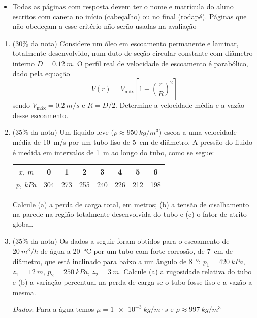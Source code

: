 \documentclass[12pt,a4paper,brazilian]{article}
\newcommand{\ratio}[1]{(#1\% da nota)}
\begin{document}
\begin{tcolorbox}[colback=black!10, colframe=black!50, title=Observações]
    \begin{itemize}
        \item Todas as páginas com resposta devem ter o nome e matrícula do
            aluno escritos com caneta no início (cabeçalho) ou no final
            (rodapé). Páginas que não obedeçam a esse critério não serão usadas
            na avaliação
    \end{itemize}
\end{tcolorbox}

\vspace{2em}

\begin{enumerate}
    \item \ratio{30} Considere um óleo em escoamento permanente e laminar,
        totalmente desenvolvido, num duto de seção circular constante com
        diâmetro interno \(D=\SI{0.12}{m}\). O perfil real de velocidade de 
        escoamento é parabólico, dado pela equação
        \[
            V(r) = V_\text{máx}\left[1-\left(\frac{r}{R}\right)^2\right]
        \]
        sendo \(V_\text{máx} = \SI{0.2}{m/s}\) e \(R=D/2\). Determine a velocidade 
        média e a vazão desse escoamento.

    \item \ratio{35} Um líquido leve (\(\rho \approx \SI{950}{kg/m^3}\)) escoa
        a uma velocidade média de \SI{10}{m/s} por um tubo liso de \SI{5}{cm}
        de diâmetro. A pressão do fluido é medida em intervalos de \SI{1}{m}
        ao longo do tubo, como se segue:

        \begin{center}
            \begin{tabular}{c|c|c|c|c|c|c|c}
                \(x,~\si{m}\) & 0 & 1 & 2 & 3 & 4 & 5 & 6 \\ \hline
                \(p,~\si{kPa}\) & 304 & 273 & 255 & 240 & 226 & 212 & 198
            \end{tabular}
        \end{center}

        Calcule (a) a perda de carga total, em metros; (b) a tensão
        de cisalhamento na parede na região totalmente desenvolvida do
        tubo e (c) o fator de atrito global.

    \item \ratio{35} Os dados a seguir foram obtidos para o escoamento de 
        \(\SI{20}{m^3/h}\) de água a \SI{20}{\celsius} por um tubo com forte 
        corrosão, de \SI{7}{cm} de diâmetro, que está inclinado para baixo a um 
        ângulo de \SI{8}{\degree}: \(p_1 = \SI{420}{kPa}\), \(z_1= \SI{12}{m}\),
        \(p_2 = \SI{250}{kPa}\), \(z_2 = \SI{3}{m}\). Calcule (a) a rugosidade
        relativa do tubo e (b) a variação percentual na perda de carga se o tubo 
        fosse liso e a vazão a mesma.

        \textit{Dados}: Para a água temos \(\mu = \SI{1e-3}{kg/m\cdot s}\) e
        \(\rho \approx \SI{997}{kg/m^3} \)
\end{enumerate}
\end{document}
